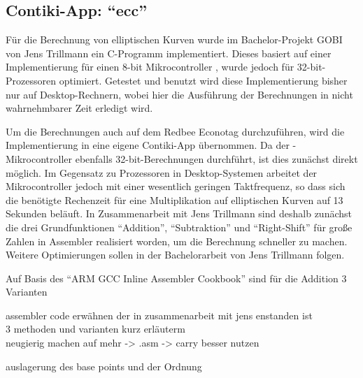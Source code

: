 \subsection{Contiki-App: "`ecc"'}

Für die Berechnung von elliptischen Kurven wurde im Bachelor-Projekt GOBI von Jens Trillmann ein C-Programm implementiert.
Dieses basiert auf einer Implementierung für einen 8-bit Mikrocontroller \cite{eccori}, wurde jedoch für 32-bit-Prozessoren optimiert.
Getestet und benutzt wird diese Implementierung bisher nur auf Desktop-Rechnern, wobei hier die Ausführung der Berechnungen in nicht
wahrnehmbarer Zeit erledigt wird.

Um die Berechnungen auch auf dem Redbee Econotag durchzuführen, wird die Implementierung in eine eigene Contiki-App übernommen.
Da der -Mikrocontroller ebenfalls 32-bit-Berechnungen durchführt, ist dies zunächst direkt möglich. Im Gegensatz
zu Prozessoren in Desktop-Systemen arbeitet der Mikrocontroller jedoch mit einer wesentlich geringen Taktfrequenz, so dass sich
die benötigte Rechenzeit für eine Multiplikation auf elliptischen Kurven auf 13 Sekunden beläuft. In Zusammenarbeit mit Jens
Trillmann sind deshalb zunächst die drei Grundfunktionen "`Addition"', "`Subtraktion"' und "`Right-Shift"' für große Zahlen in
Assembler realisiert worden, um die Berechnung schneller zu machen. Weitere Optimierungen sollen in der Bachelorarbeit von Jens
Trillmann folgen.

Auf Basis des "`ARM GCC Inline Assembler Cookbook"' \cite{armasm} sind für die Addition 3 Varianten 


assembler code erwähnen der in zusammenarbeit mit jens enstanden ist\\
3 methoden und varianten kurz erläuterm\\
neugierig machen auf mehr -> .asm -> carry besser nutzen

auslagerung des base points und der Ordnung